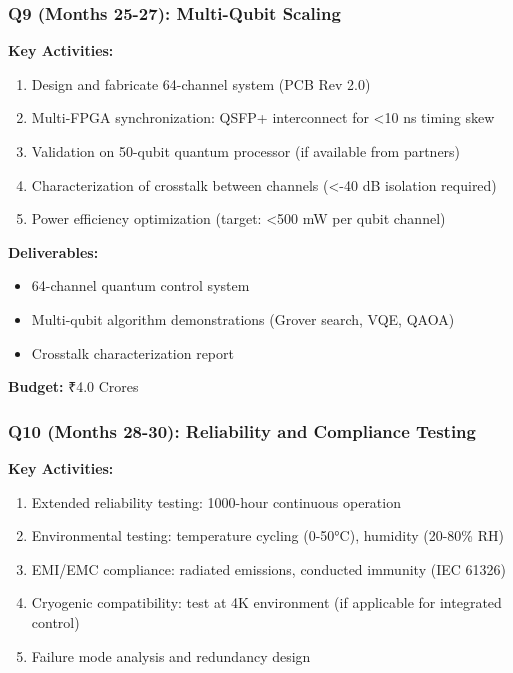 \documentclass[12pt,a4paper]{article}
\begin{document}
\begin{enumerate}[leftmargin=*]
\subsubsection{Q9 (Months 25-27): Multi-Qubit Scaling}

\textbf{Key Activities:}
\begin{enumerate}[leftmargin=*]
    \item Design and fabricate 64-channel system (PCB Rev 2.0)
    \item Multi-FPGA synchronization: QSFP+ interconnect for <10 ns timing skew
    \item Validation on 50-qubit quantum processor (if available from partners)
    \item Characterization of crosstalk between channels (<-40 dB isolation required)
    \item Power efficiency optimization (target: <500 mW per qubit channel)
\end{enumerate}

\textbf{Deliverables:}
\begin{itemize}[leftmargin=*]
    \item 64-channel quantum control system
    \item Multi-qubit algorithm demonstrations (Grover search, VQE, QAOA)
    \item Crosstalk characterization report
\end{itemize}

\textbf{Budget:} ₹4.0 Crores

\subsubsection{Q10 (Months 28-30): Reliability and Compliance Testing}

\textbf{Key Activities:}
\begin{enumerate}[leftmargin=*]
    \item Extended reliability testing: 1000-hour continuous operation
    \item Environmental testing: temperature cycling (0-50°C), humidity (20-80\% RH)
    \item EMI/EMC compliance: radiated emissions, conducted immunity (IEC 61326)
    \item Cryogenic compatibility: test at 4K environment (if applicable for integrated control)
    \item Failure mode analysis and redundancy design
\end{enumerate}


\end{enumerate}
\end{document}
